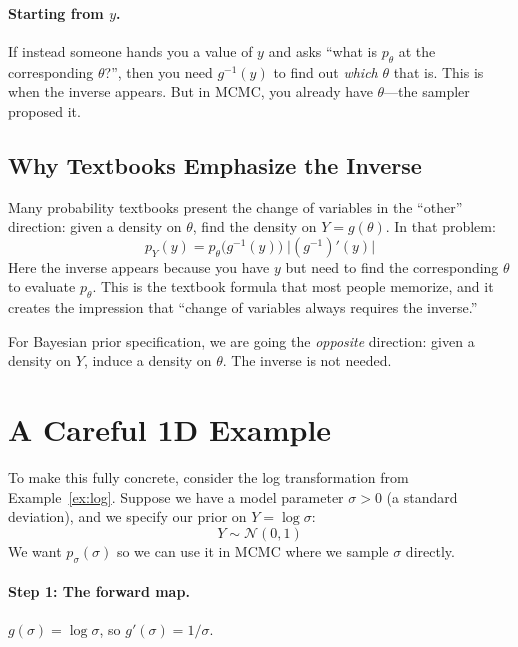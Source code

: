 \documentclass[11pt,a4paper]{article}
\theoremstyle{definition}
\newcommand{\Normal}{\mathcal{N}}
\begin{document}
\paragraph{Starting from $y$.} If instead someone hands you a value of $y$ and
asks ``what is $p_\theta$ at the corresponding $\theta$?'', then you need
$g^{-1}(y)$ to find out \emph{which} $\theta$ that is. This is when the
inverse appears. But in MCMC, you already have $\theta$---the sampler
proposed it.

\subsection{Why Textbooks Emphasize the Inverse}

Many probability textbooks present the change of variables in the ``other''
direction: given a density on $\theta$, find the density on $Y = g(\theta)$.
In that problem:
\begin{equation}
    p_Y(y) = p_\theta\!\big(g^{-1}(y)\big) \; \big|(g^{-1})'(y)\big|
\end{equation}
Here the inverse appears because you have $y$ but need to find the
corresponding $\theta$ to evaluate $p_\theta$. This is the textbook formula
that most people memorize, and it creates the impression that ``change of
variables always requires the inverse.''

For Bayesian prior specification, we are going the \emph{opposite} direction:
given a density on $Y$, induce a density on $\theta$. The inverse is not
needed.


\section{A Careful 1D Example}
\label{sec:example}

To make this fully concrete, consider the log transformation from
Example~\ref{ex:log}. Suppose we have a model parameter $\sigma > 0$ (a
standard deviation), and we specify our prior on $Y = \log \sigma$:
\begin{equation}
    Y \sim \Normal(0, 1)
\end{equation}
We want $p_\sigma(\sigma)$ so we can use it in MCMC where we sample $\sigma$
directly.

\paragraph{Step 1: The forward map.} $g(\sigma) = \log \sigma$, so
$g'(\sigma) = 1/\sigma$.
\end{document}
